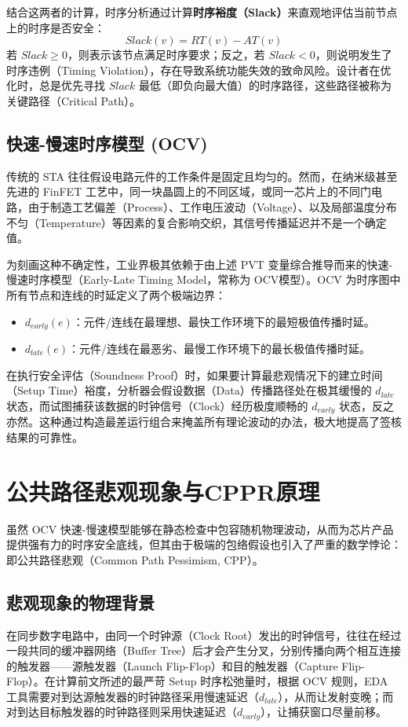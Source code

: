 结合这两者的计算，时序分析通过计算\textbf{时序裕度（Slack）}来直观地评估当前节点上的时序是否安全：
\begin{equation}
    Slack(v) = RT(v) - AT(v)
\end{equation}
若 $Slack \geq 0$，则表示该节点满足时序要求；反之，若 $Slack < 0$，则说明发生了时序违例（Timing Violation），存在导致系统功能失效的致命风险。设计者在优化时，总是优先寻找 $Slack$ 最低（即负向最大值）的时序路径，这些路径被称为关键路径（Critical Path）。

\subsection{快速-慢速时序模型 (OCV)}
传统的 STA 往往假设电路元件的工作条件是固定且均匀的。然而，在纳米级甚至先进的 FinFET 工艺中，同一块晶圆上的不同区域，或同一芯片上的不同门电路，由于制造工艺偏差（Process）、工作电压波动（Voltage）、以及局部温度分布不匀（Temperature）等因素的复合影响交织，其信号传播延迟并不是一个确定值。

为刻画这种不确定性，工业界极其依赖于由上述 PVT 变量综合推导而来的快速-慢速时序模型（Early-Late Timing Model，常称为 OCV模型）\cite{TODO_ocv_model}。OCV 为时序图中所有节点和连线的时延定义了两个极端边界：
\begin{itemize}
    \item $d_{early}(e)$：元件/连线在最理想、最快工作环境下的最短极值传播时延。
    \item $d_{late}(e)$：元件/连线在最恶劣、最慢工作环境下的最长极值传播时延。
\end{itemize}
在执行安全评估（Soundness Proof）时，如果要计算最悲观情况下的建立时间（Setup Time）裕度，分析器会假设数据（Data）传播路径处在极其缓慢的 $d_{late}$ 状态，而试图捕获该数据的时钟信号（Clock）经历极度顺畅的 $d_{early}$ 状态，反之亦然。这种通过构造最差运行组合来掩盖所有理论波动的办法，极大地提高了签核结果的可靠性。

\section{公共路径悲观现象与CPPR原理}
\label{sec:cppr_theory}

虽然 OCV 快速-慢速模型能够在静态检查中包容随机物理波动，从而为芯片产品提供强有力的时序安全底线，但其由于极端的包络假设也引入了严重的数学悖论：即公共路径悲观（Common Path Pessimism, CPP）。

\subsection{悲观现象的物理背景}
在同步数字电路中，由同一个时钟源（Clock Root）发出的时钟信号，往往在经过一段共同的缓冲器网络（Buffer Tree）后才会产生分叉，分别传播向两个相互连接的触发器——源触发器（Launch Flip-Flop）和目的触发器（Capture Flip-Flop）。在计算前文所述的最严苛 Setup 时序松弛量时，根据 OCV 规则，EDA 工具需要对到达源触发器的时钟路径采用慢速延迟（$d_{late}$），从而让发射变晚；而对到达目标触发器的时钟路径则采用快速延迟（$d_{early}$），让捕获窗口尽量前移。

